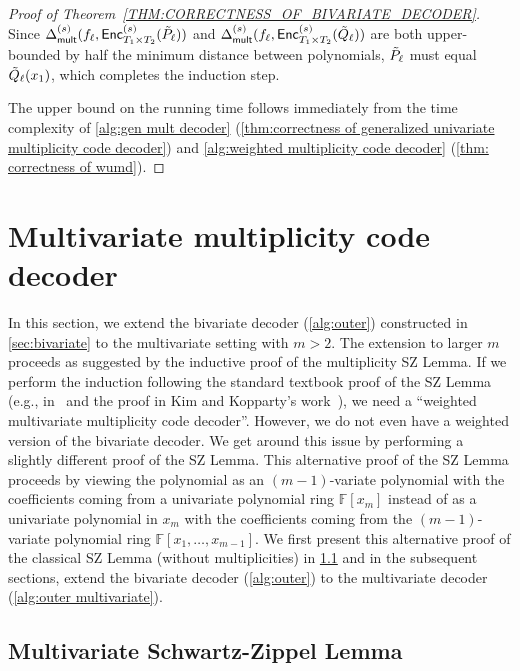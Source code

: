 \documentclass{article}
\def\Field{\mathbb{F}}
\let\F\Field
\newcommand{\enc}{{\mathsf{Enc}}}
\newcommand{\Delm}{\Delta_{\mathsf{mult}}}
\begin{document}
\begin{proof}[Proof of Theorem~\ref{THM:CORRECTNESS_OF_BIVARIATE_DECODER}]
		Since $\Delm^{(s)}(f_{\ell},\enc^{(s)}_{T_1 \times T_2}(\Tilde{P}_{\ell}))$ and $\Delm^{(s)}(f_{\ell},\enc^{(s)}_{T_1 \times T_2}(\Tilde{Q}_{\ell}))$ are both upper-bounded by half the minimum distance between polynomials, $\Tilde{P}_{\ell}$ must equal $\Tilde{Q}_{\ell}(x_1)$, which completes the induction step.
		
		
		The upper bound on the running time follows immediately from the time complexity of \cref{alg:gen mult decoder} (\cref{thm:correctness of generalized univariate multiplicity code decoder}) and \cref{alg:weighted multiplicity code decoder} (\cref{thm: correctness of wumd}).		
	\end{proof}
	
	
	
	\section{Multivariate multiplicity code decoder}\label{sec: multivariate algorithm}
	
	In this section, we extend the bivariate decoder (\cref{alg:outer})
	constructed in \cref{sec:bivariate} to the multivariate setting with
	$m>2$. The extension to larger $m$ proceeds as suggested by the
	inductive proof of the multiplicity SZ Lemma. If we perform the
	induction following the standard textbook proof of the SZ Lemma (e.g., in~\cite{AroraBarak} and the proof in Kim and Kopparty's work~\cite{KimK2017}), we
	need a ``weighted multivariate multiplicity code decoder''. However,
	we do not even have a weighted version of the bivariate decoder. We get
	around this issue by performing a slightly different proof of the SZ
	Lemma. This alternative proof of the SZ Lemma
	proceeds by viewing the polynomial as an $(m-1)$-variate polynomial
	with the coefficients coming from a univariate polynomial ring
	$\F[x_m]$ instead of as a univariate polynomial in $x_m$ with the
	coefficients coming from the $(m-1)$-variate polynomial ring
	$\F[x_1, \ldots, x_{m-1}]$. We first present this alternative proof of the
	classical SZ Lemma (without multiplicities) in \cref{sec:msz} and in
	the subsequent sections, extend the bivariate decoder
	(\cref{alg:outer}) to the multivariate decoder (\cref{alg:outer
		multivariate}). 
	
	
	
	
	\subsection{Multivariate Schwartz-Zippel Lemma}\label{sec:msz}
	
\end{document}
